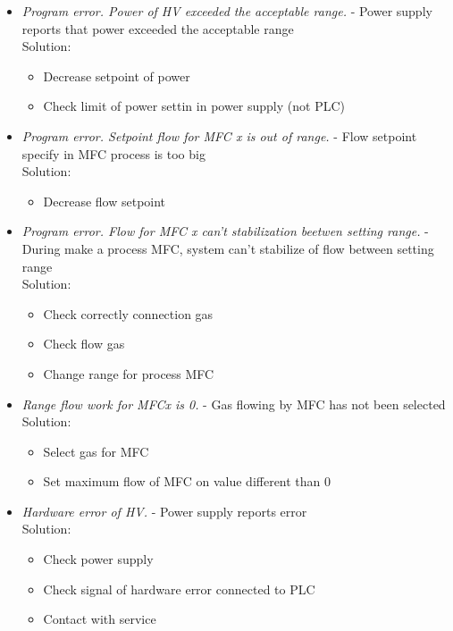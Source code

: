 \begin{itemize}
	\item \textit{Program error. Power of HV exceeded the acceptable range.}  - Power supply reports that power  exceeded the acceptable range \\
 		Solution:
		\begin{itemize}
			\item Decrease  setpoint of power 
			\item Check limit of power settin in power supply (not PLC)
		\end{itemize}

	\item \textit{Program error. Setpoint flow for MFC x is out of range.} - Flow setpoint specify in MFC process is too big\\
 		Solution:
		\begin{itemize}
			\item Decrease flow setpoint
		\end{itemize}

	\item \textit{Program error. Flow for MFC x can't stabilization beetwen setting range.} - During make a process MFC, system can't stabilize of flow between setting range \\
 		Solution:
		\begin{itemize}
			\item Check correctly connection gas 
			\item  Check flow gas
			\item Change range for process MFC
		\end{itemize}

	\item \textit{Range flow work for MFCx is 0.} - Gas flowing by MFC has not been selected \\
 		Solution:
		\begin{itemize}
			\item Select gas for MFC 
			\item Set maximum flow of MFC on value different than 0
		\end{itemize}

	\item \textit{Hardware error of HV.}  - Power supply reports error \\
 		Solution:
		\begin{itemize}
			\item Check power supply 
			\item Check signal of hardware error connected to PLC 
			\item Contact with service
		\end{itemize}


\end{itemize}

